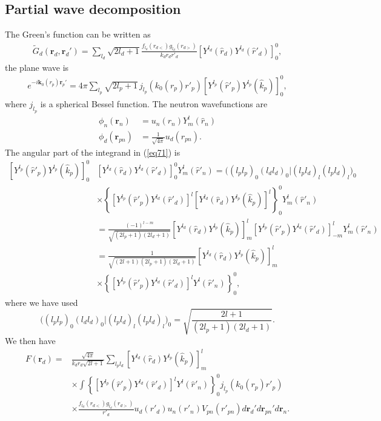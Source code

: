 \documentclass[a4paper,11pt]{article}
\begin{document}
\subsection{Partial wave decomposition}

The Green's function can be written as
\begin{align}\label{eq44}
\tilde G_d(\mathbf r_d,\mathbf r_d')=\sum_{l_d}\sqrt{2l_d+1}\frac{f_{l_d}(r_{d<})g_{l_d}(r_{d>})}{k_dr_dr'_d}\left[Y^{l_d}(\hat r_d) Y^{l_d}(\hat r'_d)\right]^0_0,
\end{align}
the plane wave is
\begin{align}\label{eq45}
e^{-i\mathbf k_0(r_p)\mathbf r_p'}=4\pi\sum_{l_p}\sqrt{2l_p+1}\,j_{l_p}(k_0(r_p) r'_p)\left[Y^{l_p}(\hat r'_p) Y^{l_p}(\hat k_p)\right]^0_0,
\end{align}
where $j_{l_p}$ is a spherical Bessel function.  The neutron wavefunctions are
\begin{align}\label{eq38}
\nonumber \phi_n(\mathbf{r}_n)&=u_n(r_n)Y^{l}_{m}(\hat r_n)\\
\phi_d(\mathbf{r}_{pn})&=\frac{1}{\sqrt{4\pi}}u_d(r_{pn}).
\end{align}
The angular part of the integrand in (\ref{eq71}) is
\begin{align}\label{eq46}
\nonumber\left[Y^{l_p}(\hat r'_p) Y^{l_p}(\hat k_p)\right]^0_0&\left[Y^{l_d}(\hat r_d) Y^{l_d}(\hat r'_d)\right]^0_0Y_m^l(\hat r'_n)=\bigl((l_p l_p)_0(l_d l_d)_0|(l_p l_d)_l(l_p l_d)_{l}\bigr)_0\\
\nonumber&\times \left\{\left[Y^{l_p}(\hat r'_p) Y^{l_d}(\hat r'_d)\right]^l\left[Y^{l_d}(\hat r_d) Y^{l_p}(\hat k_p)\right]^l\right\}^0_0Y_m^l(\hat r'_n)\\
\nonumber&=\frac{(-1)^{l-m}}{\sqrt{(2l_p+1)(2l_d+1)}}\left[Y^{l_d}(\hat r_d) Y^{l_p}(\hat k_p)\right]^l_m\left[Y^{l_p}(\hat r'_p) Y^{l_d}(\hat r'_d)\right]^l_{-m}Y_m^l(\hat r'_n)\\
\nonumber &=\frac{1}{\sqrt{(2l+1)(2l_p+1)(2l_d+1)}}\left[Y^{l_d}(\hat r_d) Y^{l_p}(\hat k_p)\right]^l_m\\
&\times\left\{\left[Y^{l_p}(\hat r'_p) Y^{l_d}(\hat r'_d)\right]^lY^l(\hat r'_n)\right\}^0_0,
\end{align}
where we have used
\begin{equation}\label{eq61}
\bigl((l_p l_p)_0(l_d l_d)_0|(l_p l_d)_l(l_p l_d)_{l}\bigr)_0=\sqrt{\frac{2l+1}{(2l_p+1)(2l_d+1)}}.
\end{equation}
We then have 
 \begin{align}\label{eq47}
\nonumber F(\mathbf r_d)=&\frac{\sqrt{4\pi}}{k_dr_d\sqrt{2l+1}}\sum_{l_pl_d} \left[Y^{l_d}(\hat r_d) Y^{l_p}(\hat k_p)\right]^l_m\\
\nonumber&\times\int \left\{\left[Y^{l_p}(\hat r'_p) Y^{l_d}(\hat r'_d)\right]^lY^l(\hat r'_n)\right\}^0_0j_{l_p}(k_0(r_p) r'_p)\\
&\times \frac{f_{l_d}(r_{d<})g_{l_d}(r_{d>})}{r'_d}  u_d(r'_d)u_n(r'_n)V_{pn}(r'_{pn}) d\mathbf r_d' d\mathbf r_{pn}'d\mathbf r_n.
 \end{align}
\end{document}
